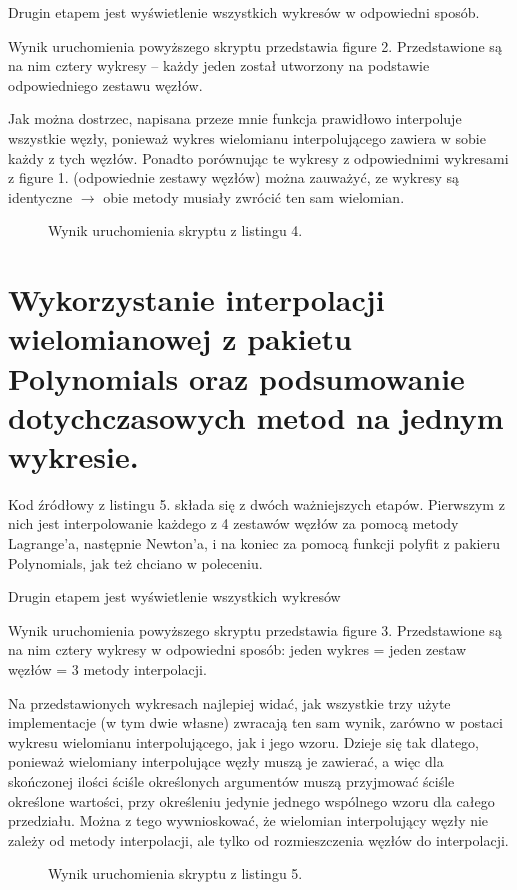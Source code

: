\documentclass[a4paper,oneside,11pt]{report}
\begin{document}
Drugin etapem jest wyświetlenie wszystkich wykresów w odpowiedni sposób.

Wynik uruchomienia powyższego skryptu przedstawia figure 2. Przedstawione są na nim cztery wykresy – każdy jeden został utworzony na podstawie odpowiedniego zestawu węzłów.

Jak można dostrzec, napisana przeze mnie funkcja prawidłowo interpoluje wszystkie węzły, ponieważ wykres wielomianu interpolującego zawiera w sobie każdy z tych węzłów. Ponadto porównując te wykresy z odpowiednimi wykresami z figure 1. (odpowiednie zestawy węzłów) można zauważyć, ze wykresy są identyczne $\rightarrow$ obie metody musiały zwrócić ten sam wielomian.
\begin{figure}[htp] 
\caption{Wynik uruchomienia skryptu z listingu 4.}
\end{figure}
\newpage
\section{Wykorzystanie interpolacji wielomianowej z pakietu Polynomials oraz podsumowanie dotychczasowych metod na jednym wykresie.}



Kod źródłowy z listingu 5. składa się z dwóch ważniejszych etapów. Pierwszym z nich jest interpolowanie każdego z 4 zestawów węzłów za pomocą metody Lagrange’a, następnie Newton’a, i na koniec za pomocą funkcji polyfit z pakieru Polynomials, jak też chciano w poleceniu.

Drugin etapem jest wyświetlenie wszystkich wykresów

Wynik uruchomienia powyższego skryptu przedstawia figure 3. Przedstawione są na nim cztery wykresy w odpowiedni sposób: jeden wykres = jeden zestaw węzłów = 3 metody interpolacji.

Na przedstawionych wykresach najlepiej widać, jak wszystkie trzy użyte implementacje (w tym dwie własne) zwracają ten sam wynik, zarówno w postaci wykresu wielomianu interpolującego, jak i jego wzoru. Dzieje się tak dlatego, ponieważ wielomiany interpolujące węzły muszą je zawierać, a więc dla skończonej ilości ściśle określonych argumentów muszą przyjmować ściśle określone wartości, przy określeniu jedynie jednego wspólnego wzoru dla całego przedziału. Można z tego wywnioskować, że wielomian interpolujący węzły nie zależy od metody interpolacji, ale tylko od rozmieszczenia węzłów do interpolacji.
\begin{figure}[htp] 
\caption{Wynik uruchomienia skryptu z listingu 5.}
\end{figure}
\newpage
\end{document}
